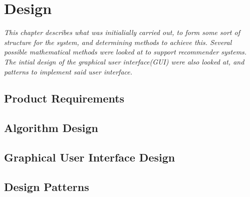 \chapter{Design}

\textit{This chapter describes what was initialially carried out, to form some sort of structure for the system, and determining methods to achieve this. Several possible mathematical methods were looked at to support recommender systems. The intial design of the graphical user interface(GUI) were also looked at, and patterns to implement said user interface.}

\section{Product Requirements}
\label{Requirements}

\section{Algorithm Design}
\label{AlgDes}

\section{Graphical User Interface Design}
\label{GUIDes}

\section{Design Patterns}
\label{DesPatterns}
